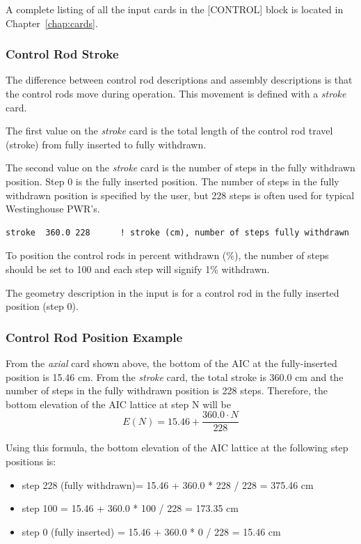 A complete listing of all the input cards in the [CONTROL] block is located in Chapter~\ref{chap:cards}.

\subsubsection{Control Rod Stroke}
\label{sec:stroke}

The difference between control rod descriptions and assembly descriptions is that
the control rods move during operation.  This movement is defined with a {\it stroke} card.

The first value on the {\it stroke} card is the total length of the control rod travel (stroke)
from fully inserted to fully withdrawn.

The second value on the {\it stroke} card is the number of steps in the fully withdrawn position.
Step 0 is the fully inserted position.  The number of steps in the fully withdrawn position
is specified by the user, but 228 steps is often used for typical Westinghouse PWR's.
\begin{Verbatim}[fontsize=\small]
  stroke  360.0 228      ! stroke (cm), number of steps fully withdrawn
\end{Verbatim}

To position the control rods in percent withdrawn (\%), the number of steps should be set to 100 and
each step will signify 1\% withdrawn.

The geometry description in the input is for a control rod in the fully inserted position (step 0).

\subsubsection{Control Rod Position Example}

From the {\it axial} card shown above, the bottom of the AIC at the fully-inserted position is 15.46 cm.
From the {\it stroke} card, the total stroke is 360.0 cm and the number of steps in the fully withdrawn
position is 228 steps.
Therefore, the bottom elevation of the AIC lattice at step N will be
\begin{equation}
   E(N) = 15.46 + \frac{360.0 \cdot N}{228}
\end{equation}

Using this formula, the bottom elevation of the AIC lattice at the following step positions is:
\begin{itemize}   %
 \item step 228 (fully withdrawn)= 15.46 + 360.0 * 228 / 228 = 375.46 cm
 \item step 100 = 15.46 + 360.0 * 100 / 228 = 173.35 cm
 \item step 0 (fully inserted) = 15.46 + 360.0 * 0 / 228 = 15.46 cm
\end{itemize}

